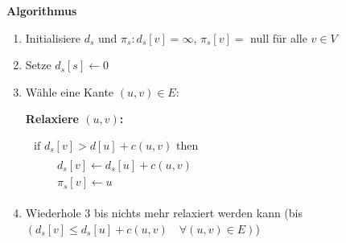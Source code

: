 \vspace{-4pt}
\begin{sectionbox}

\textbf{Algorithmus}\smallskip
\begin{enumerate}
    \item Initialisiere $d_{s}$ und $\pi_{s}: d_{s}[v]=\infty$, $\pi_{s}[v]=$ null für alle $v \in V$
    \item Setze $d_{s}[s] \leftarrow 0$
    \item Wähle eine Kante $(u, v) \in E$:\par
    \begin{greenbox}
    \textbf{Relaxiere $(u, v)$:}\par
    $\begin{array}{l}
    \text { if } d_{s}[v]>d[u]+c(u, v) \text { then } \\
    \qquad \begin{array}{l}
    d_{s}[v] \leftarrow d_{s}[u]+c(u, v) \\
    \pi_{s}[v] \leftarrow u
    \end{array}
    \end{array}$
    \end{greenbox}
    \item Wiederhole 3 bis nichts mehr relaxiert werden kann (bis $\left(d_{s}[v] \leq d_{s}[u]+c(u, v) \quad \forall(u, v) \in E\right)$)
\end{enumerate}
\end{sectionbox}
\vspace{-4pt}
